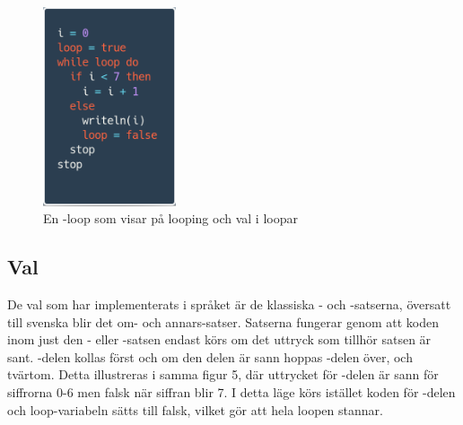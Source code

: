 \documentclass{article}
\begin{document}
\FloatBarrier
\begin{figure}[h!]
    \centering
    \includegraphics[width=0.35\textwidth]{while.png}
    \caption{En -loop som visar på looping och val i loopar}
    \label{fig:while1}
\end{figure}
\FloatBarrier
\newpage
\subsection{Val}
De val som har implementerats i språket är de klassiska - och -satserna, översatt till svenska blir det om- och annars-satser. Satserna fungerar genom att koden inom just den - eller -satsen endast körs om det uttryck som tillhör satsen är sant. -delen kollas först och om den delen är sann hoppas -delen över, och tvärtom. Detta illustreras i samma figur 5, där uttrycket för -delen är sann för siffrorna 0-6 men falsk när siffran blir 7. I detta läge körs istället koden för -delen och loop-variabeln sätts till falsk, vilket gör att hela loopen stannar.
\end{document}
